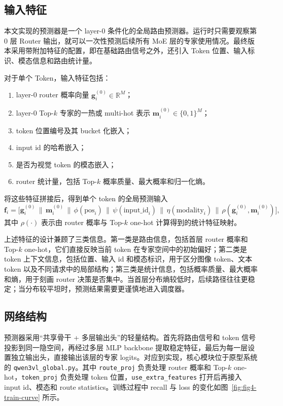 \subsection{输入特征}
本文实现的预测器是一个 layer-0 条件化的全局路由预测器。运行时只需要观察第 0 层 Router 输出，就可以一次性预测后续所有 MoE 层的专家使用情况。最终版本采用带附加特征的配置，即在基础路由信号之外，还引入 Token 位置、输入标识、模态信息和路由统计量。

对于单个 Token，输入特征包括：
\begin{enumerate}
    \item layer-0 router 概率向量 $\mathbf{g}_i^{(0)} \in \mathbb{R}^{M}$；
    \item layer-0 Top-$k$ 专家的一热或 multi-hot 表示 $\mathbf{m}_i^{(0)} \in \{0,1\}^{M}$；
    \item token 位置编号及其 bucket 化嵌入；
    \item input id 的哈希嵌入；
    \item 是否为视觉 token 的模态嵌入；
    \item router 统计量，包括 Top-$k$ 概率质量、最大概率和归一化熵。
\end{enumerate}

将这些特征拼接后，得到单个 token 的全局预测输入
\begin{equation}
\mathbf{f}_i = \big[\mathbf{g}_i^{(0)} \,\|\, \mathbf{m}_i^{(0)} \,\|\, \phi(\text{pos}_i) \,\|\, \psi(\text{input\_id}_i) \,\|\, \eta(\text{modality}_i) \,\|\, \rho(\mathbf{g}_i^{(0)}, \mathbf{m}_i^{(0)})\big],
\end{equation}
其中 $\rho(\cdot)$ 表示由 router 概率与 Top-$k$ one-hot 计算得到的统计特征映射。

上述特征的设计兼顾了三类信息。第一类是路由信息，包括首层 router 概率和 Top-$k$ one-hot，它们直接反映当前 token 在专家空间中的初始偏好；第二类是 token 上下文信息，包括位置、输入 id 和模态标识，用于区分图像 token、文本 token 以及不同请求中的局部结构；第三类是统计信息，包括概率质量、最大概率和熵，用于刻画 router 决策是否集中。当首层分布熵较低时，后续路径往往更稳定；当分布较平坦时，预测结果需要更谨慎地进入调度器。


\subsection{网络结构}
预测器采用“共享骨干 + 多层输出头”的轻量结构。首先将路由信号和 token 信号投影到同一隐空间，再经过多层 MLP backbone 提取稳定特征，最后为每一层设置独立输出头，直接输出该层的专家 logits。对应到实现，核心模块位于原型系统的 \texttt{qwen3vl\_global.py}。其中 \texttt{route\_proj} 负责处理 router 概率和 Top-$k$ one-hot，\texttt{token\_proj} 负责处理 token 位置，\texttt{use\_extra\_features} 打开后再接入 input id、模态和 route statistics。训练过程中 recall 与 loss 的变化如图~\ref{fig:fig4-train-curve} 所示。

